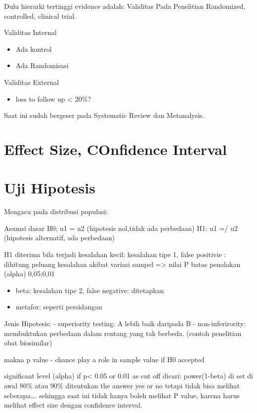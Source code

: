 \documentclass[
  letterpaper,
  DIV=11,
  numbers=noendperiod]{scrreprt}
\providecommand{\tightlist}{%
  \setlength{\itemsep}{0pt}\setlength{\parskip}{0pt}}\usepackage{longtable,booktabs,array}
\begin{document}
Dulu hierarki tertinggi evidence adalah: Validitas Pada Penelitian
Randomized, controlled, clinical trial.

Validitas Internal

\begin{itemize}
\tightlist
\item
  Ada kontrol
\item
  Ada Randomisasi
\end{itemize}

Validitas External

\begin{itemize}
\tightlist
\item
  loss to follow up \textless{} 20\%?
\end{itemize}

Saat ini sudah bergeser pada Systematic Review dan Metanalysis.

\section{Effect Size, COnfidence
Interval}\label{effect-size-confidence-interval}

\section{Uji Hipotesis}\label{uji-hipotesis}

Mengacu pada distribusi populasi:

Asumsi dasar H0; u1 = u2 (hipotesis nol,tidak ada perbedaan) H1: u1 =/
u2 (hipotesis alternatif, ada perbedaan)

H1 diterima bila terjadi kesalahan kecil: kesalahan tipe 1, false
positivie : dihitung peluang kesalahan akibat variasi sampel
=\textgreater{} nilai P batas penolakan (alpha) 0,05;0,01

\begin{itemize}
\tightlist
\item
  beta: kesalahan tipe 2, false negative: ditetapkan
\item
  metafor: seperti persidangan
\end{itemize}

Jenis Hipotesis: - superiority testing: A lebih baik daripada B -
non-inferirority: membuktukan perbedaan dalam rentang yang tak berbeda.
(contoh penelitian obat biosimilar)

makna p value - chance play a role in sample value if H0 accepted

significant level (alpha) if p\textless{} 0.05 or 0.01 as cut off
dicari: power(1-beta) di set di awal 80\% atau 90\% ditentukan the
answer yes or no tetapi tidak bisa melihat seberapa\ldots. sehingga saat
ini tidak hanya boleh melihat P value, karena harus melihat effect size
dengan confidence interval.
\end{document}
